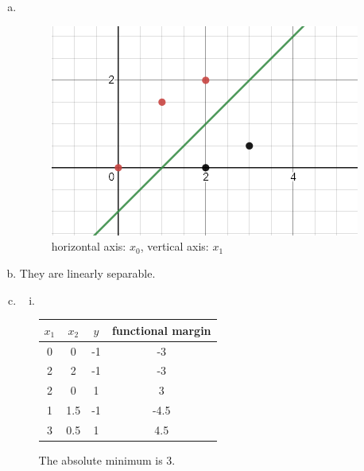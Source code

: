 \documentclass[12pt]{article}
\title{} %
\author{Liheng Cao} %
\date{\today} %
\begin{document}
\maketitle

\section{}
\begin{enumerate}[(a)]
	\item \,\begin{figure}[H]
		\centering
		\includegraphics{images/1a.png}
		\caption{horizontal axis: $x_0$, vertical axis: $ x_1 $}
		\label{fig:1:a}
	\end{figure}

	\item They are linearly separable.
	
	\item
		\begin{enumerate}[i.]
			\item\,
			\begin{table}[H]
				\centering
					\begin{tabular}{|c|c|c|c|}
					\hline 
					$x_1$ & $ x_2 $ & $ y $ & functional margin\\\hline
					\hline
					0 & 0 & -1 & -3\\\hline
					2 & 2 & -1 & -3\\\hline
					2 & 0 & 1 & 3\\\hline
					1 & 1.5 & -1 & -4.5\\\hline
					3 & 0.5 & 1 & 4.5\\\hline				
				\end{tabular}
			\end{table}
			The absolute minimum is 3. 
		

\end{enumerate}
\end{enumerate}
\end{document}
